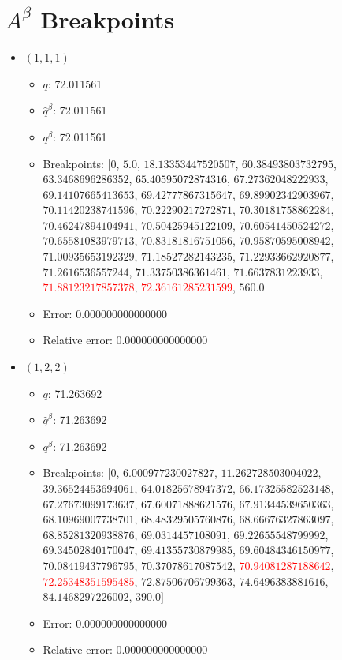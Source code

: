 \documentclass{article}%
\begin{document}
\section{$A^\beta$ Breakpoints}%
\thispagestyle{plain}%
\begin{itemize}%
	\item $(1, 1, 1)$%
	\begin{itemize}%
		\item $q$: 72.011561%
		\item $\hat{q}^\beta$: 72.011561%
		\item $q^\beta$: 72.011561%
		\item Breakpoints: $[$$0$, $5.0$, $18.13353447520507$, $60.38493803732795$, $63.3468696286352$, $65.40595072874316$, $67.27362048222933$, $69.14107665413653$, $69.42777867315647$, $69.89902342903967$, $70.11420238741596$, $70.22290217272871$, $70.30181758862284$, $70.46247894104941$, $70.50425945122109$, $70.60541450524272$, $70.65581083979713$, $70.83181816751056$, $70.95870595008942$, $71.00935653192329$, $71.18527282143235$, $71.22933662920877$, $71.2616536557244$, $71.33750386361461$, $71.6637831223933$, \textcolor{red}{$71.88123217857378$}, \textcolor{red}{$72.36161285231599$}, $560.0$$]$%
		\item Error: 0.000000000000000%
		\item Relative error: 0.000000000000000%
	\end{itemize}%
	\item $(1, 2, 2)$%
	\begin{itemize}%
		\item $q$: 71.263692%
		\item $\hat{q}^\beta$: 71.263692%
		\item $q^\beta$: 71.263692%
		\item Breakpoints: $[$$0$, $6.000977230027827$, $11.262728503004022$, $39.36524453694061$, $64.01825678947372$, $66.17325582523148$, $67.27673099173637$, $67.60071888621576$, $67.91344539650363$, $68.10969007738701$, $68.48329505760876$, $68.66676327863097$, $68.85281320938876$, $69.0314457108091$, $69.22655548799992$, $69.34502840170047$, $69.41355730879985$, $69.60484346150977$, $70.08419437796795$, $70.37078617087542$, \textcolor{red}{$70.94081287188642$}, \textcolor{red}{$72.25348351595485$}, $72.87506706799363$, $74.6496383881616$, $84.1468297226002$, $390.0$$]$%
		\item Error: 0.000000000000000%
		\item Relative error: 0.000000000000000%
	\end{itemize}%

\end{itemize}
\end{document}
